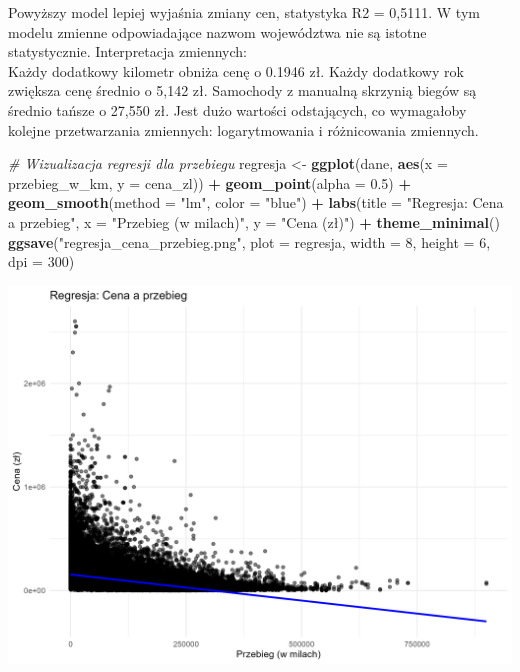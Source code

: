 \documentclass[
]{article}
\newenvironment{Shaded}{\begin{snugshade}}{\end{snugshade}}
\newcommand{\AttributeTok}[1]{\textcolor[rgb]{0.13,0.29,0.53}{#1}}
\newcommand{\CommentTok}[1]{\textcolor[rgb]{0.56,0.35,0.01}{\textit{#1}}}
\newcommand{\DecValTok}[1]{\textcolor[rgb]{0.00,0.00,0.81}{#1}}
\newcommand{\FloatTok}[1]{\textcolor[rgb]{0.00,0.00,0.81}{#1}}
\newcommand{\FunctionTok}[1]{\textcolor[rgb]{0.13,0.29,0.53}{\textbf{#1}}}
\newcommand{\NormalTok}[1]{#1}
\newcommand{\OtherTok}[1]{\textcolor[rgb]{0.56,0.35,0.01}{#1}}
\newcommand{\SpecialCharTok}[1]{\textcolor[rgb]{0.81,0.36,0.00}{\textbf{#1}}}
\newcommand{\StringTok}[1]{\textcolor[rgb]{0.31,0.60,0.02}{#1}}
\begin{document}
Powyższy model lepiej wyjaśnia zmiany cen, statystyka R2 = 0,5111. W tym
modelu zmienne odpowiadające nazwom województwa nie są istotne
statystycznie. Interpretacja zmiennych:\\
Każdy dodatkowy kilometr obniża cenę o 0.1946 zł. Każdy dodatkowy rok
zwiększa cenę średnio o 5,142 zł. Samochody z manualną skrzynią biegów
są średnio tańsze o 27,550 zł. Jest dużo wartości odstających, co
wymagałoby kolejne przetwarzania zmiennych: logarytmowania i
różnicowania zmiennych.

\begin{Shaded}
\begin{Highlighting}[]
\CommentTok{\# Wizualizacja regresji dla przebiegu}
\NormalTok{regresja }\OtherTok{\textless{}{-}} \FunctionTok{ggplot}\NormalTok{(dane, }\FunctionTok{aes}\NormalTok{(}\AttributeTok{x =}\NormalTok{ przebieg\_w\_km, }\AttributeTok{y =}\NormalTok{ cena\_zl)) }\SpecialCharTok{+}
  \FunctionTok{geom\_point}\NormalTok{(}\AttributeTok{alpha =} \FloatTok{0.5}\NormalTok{) }\SpecialCharTok{+}
  \FunctionTok{geom\_smooth}\NormalTok{(}\AttributeTok{method =} \StringTok{"lm"}\NormalTok{, }\AttributeTok{color =} \StringTok{"blue"}\NormalTok{) }\SpecialCharTok{+}
  \FunctionTok{labs}\NormalTok{(}\AttributeTok{title =} \StringTok{"Regresja: Cena a przebieg"}\NormalTok{, }\AttributeTok{x =} \StringTok{"Przebieg (w milach)"}\NormalTok{, }\AttributeTok{y =} \StringTok{"Cena (zł)"}\NormalTok{) }\SpecialCharTok{+}
  \FunctionTok{theme\_minimal}\NormalTok{()}
\FunctionTok{ggsave}\NormalTok{(}\StringTok{"regresja\_cena\_przebieg.png"}\NormalTok{, }\AttributeTok{plot =}\NormalTok{ regresja, }\AttributeTok{width =} \DecValTok{8}\NormalTok{, }\AttributeTok{height =} \DecValTok{6}\NormalTok{, }\AttributeTok{dpi =} \DecValTok{300}\NormalTok{)}
\end{Highlighting}
\end{Shaded}

\includegraphics[width=1\linewidth]{analiza/regresja_cena_przebieg}
\end{document}
